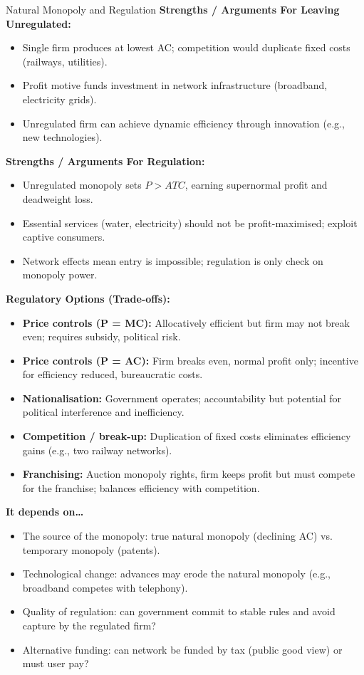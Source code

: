 \documentclass[11pt, a4paper, twoside]{book}
\begin{document}
\begin{evaluation}{Natural Monopoly and Regulation}
\textbf{Strengths / Arguments For Leaving Unregulated:}
\begin{itemize}[leftmargin=*, nosep]
\item Single firm produces at lowest AC; competition would duplicate fixed costs (railways, utilities).
\item Profit motive funds investment in network infrastructure (broadband, electricity grids).
\item Unregulated firm can achieve dynamic efficiency through innovation (e.g., new technologies).
\end{itemize}
\textbf{Strengths / Arguments For Regulation:}
\begin{itemize}[leftmargin=*, nosep]
\item Unregulated monopoly sets $P > ATC$, earning supernormal profit and deadweight loss.
\item Essential services (water, electricity) should not be profit-maximised; exploit captive consumers.
\item Network effects mean entry is impossible; regulation is only check on monopoly power.
\end{itemize}
\textbf{Regulatory Options (Trade-offs):}
\begin{itemize}[leftmargin=*, nosep]
\item \textbf{Price controls (P = MC):} Allocatively efficient but firm may not break even; requires subsidy, political risk.
\item \textbf{Price controls (P = AC):} Firm breaks even, normal profit only; incentive for efficiency reduced, bureaucratic costs.
\item \textbf{Nationalisation:} Government operates; accountability but potential for political interference and inefficiency.
\item \textbf{Competition / break-up:} Duplication of fixed costs eliminates efficiency gains (e.g., two railway networks).
\item \textbf{Franchising:} Auction monopoly rights, firm keeps profit but must compete for the franchise; balances efficiency with competition.
\end{itemize}
\textbf{It depends on\ldots}
\begin{itemize}[leftmargin=*, nosep]
\item The source of the monopoly: true natural monopoly (declining AC) vs. temporary monopoly (patents).
\item Technological change: advances may erode the natural monopoly (e.g., broadband competes with telephony).
\item Quality of regulation: can government commit to stable rules and avoid capture by the regulated firm?
\item Alternative funding: can network be funded by tax (public good view) or must user pay?
\end{itemize}
\end{evaluation}
\end{document}
